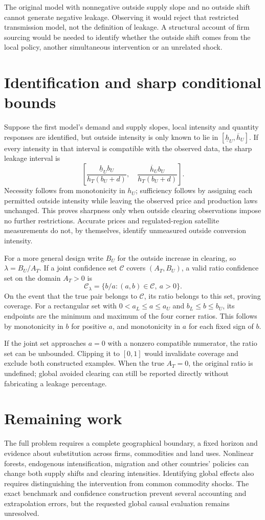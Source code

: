 \documentclass[11pt]{article}
\begin{document}
The original model with nonnegative outside supply slope and no outside shift cannot generate negative leakage. Observing it would reject that restricted transmission model, not the definition of leakage. A structural account of firm sourcing would be needed to identify whether the outside shift comes from the local policy, another simultaneous intervention or an unrelated shock.

\section*{Identification and sharp conditional bounds}
Suppose the first model's demand and supply slopes, local intensity and quantity responses are identified, but outside intensity is only known to lie in $[\underline h_U,\overline h_U]$. If every intensity in that interval is compatible with the observed data, the sharp leakage interval is
\[
 \left[
 \frac{\underline h_Ub_U}{h_T(b_U+d)},\quad
 \frac{\overline h_Ub_U}{h_T(b_U+d)}
 \right].
\]
Necessity follows from monotonicity in $h_U$; sufficiency follows by assigning each permitted outside intensity while leaving the observed price and production laws unchanged. This proves sharpness only when outside clearing observations impose no further restrictions. Accurate prices and regulated-region satellite measurements do not, by themselves, identify unmeasured outside conversion intensity.

For a more general design write $B_U$ for the outside increase in clearing, so $\lambda=B_U/A_T$. If a joint confidence set $\mathcal C$ covers $(A_T,B_U)$, a valid ratio confidence set on the domain $A_T>0$ is
\[
 \mathcal C_\lambda=\{b/a:(a,b)\in\mathcal C,\ a>0\}.
\]
On the event that the true pair belongs to $\mathcal C$, its ratio belongs to this set, proving coverage. For a rectangular set with $0<a_L\leq a\leq a_U$ and $b_L\leq b\leq b_U$, its endpoints are the minimum and maximum of the four corner ratios. This follows by monotonicity in $b$ for positive $a$, and monotonicity in $a$ for each fixed sign of $b$.

If the joint set approaches $a=0$ with a nonzero compatible numerator, the ratio set can be unbounded. Clipping it to $[0,1]$ would invalidate coverage and exclude both constructed examples. When the true $A_T=0$, the original ratio is undefined; global avoided clearing can still be reported directly without fabricating a leakage percentage.

\section*{Remaining work}
The full problem requires a complete geographical boundary, a fixed horizon and evidence about substitution across firms, commodities and land uses. Nonlinear forests, endogenous intensification, migration and other countries' policies can change both supply shifts and clearing intensities. Identifying global effects also requires distinguishing the intervention from common commodity shocks. The exact benchmark and confidence construction prevent several accounting and extrapolation errors, but the requested global causal evaluation remains unresolved.
\end{document}
